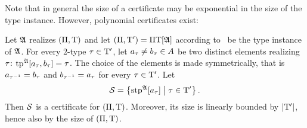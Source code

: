 Note that in general the size of a certificate may be exponential in
the size of the type instance. However, polynomial certificates exist:
\begin{lemma}\label{lem:cert-extract}
Let $\mathfrak{A}$ realizes $(\Pi,\mathrm{T})$ and let $(\Pi,{\mathrm{T}'}) =
\Pi\mathrm{T}[\mathfrak{A}]$ according to~ be the type instance
of $\mathfrak{A}$.
For every $2$-type $\tau \in {\mathrm{T}'}$,
let $a_{\tau} \neq b_{\tau} \in A$ be two distinct elements realizing
$\tau$: $\operatorname{tp}^{\mathfrak{A}}[a_{\tau},b_{\tau}] = \tau$. The choice of the
elements is made symmetrically, that is $a_{\tau^{-1}} = b_{\tau}$ and
$b_{\tau^{-1}} = a_{\tau}$ for every $\tau\in{\mathrm{T}'}$.
Let 
\[
  \mathcal{S} = \left\{\operatorname{stp}^{\mathfrak{A}}[a_{\tau}]\mathrel{}\middle|\mathrel{}\tau\in{\mathrm{T}'}\right\}.
\]
Then $\mathcal{S}$ is a certificate for $(\Pi,\mathrm{T})$. Moreover, its size is
linearly bounded by $\left|{\mathrm{T}'}\right|$, hence also by the size of $(\Pi,\mathrm{T})$.
\end{lemma}
